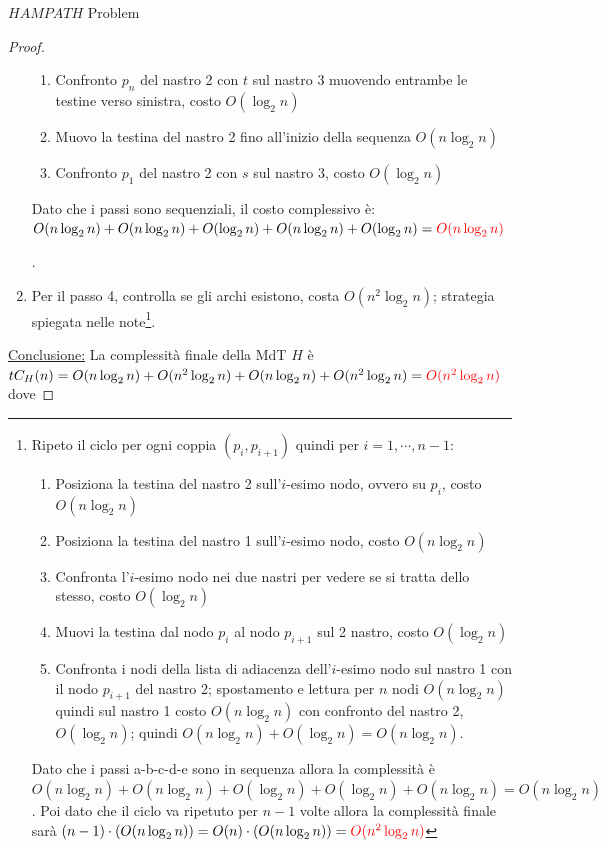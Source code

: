 \documentclass{article}  %
\theoremstyle{definition}
\begin{document}
\begin{theorem}{$HAMPATH$ Problem}
\begin{proof}
\begin{enumerate}
{\begin{enumerate}
					      \item Confronto $p_n$ del nastro 2 con $t$ sul nastro 3 muovendo entrambe le testine verso sinistra, costo $O(\log_2n)$
					      \item Muovo la testina del nastro 2 fino all'inizio della sequenza $O(n\log_2n)$
					      \item Confronto $p_1$ del nastro 2 con $s$ sul nastro 3, costo $O(\log_2n)$
				      \end{enumerate}
				      Dato che i passi sono sequenziali, il costo complessivo è: $O(n\log_2n)+O(n\log_2n)+O(\log_2n)+O(n\log_2n)+O(\log_2n)=\textcolor{red}{O(n\log_2n)}$\\
			      }.
			\item Per il passo 4, controlla se gli archi esistono, costa $O(n^2\log_2n)$; strategia spiegata nelle note\footnote{
				      Ripeto il ciclo per ogni coppia $(p_i, p_{i+1})$ quindi per $i=1, \cdots, n-1$:
				      \begin{enumerate}
					      \item Posiziona la testina del nastro 2 sull'$i$-esimo nodo, ovvero su $p_i$, costo $O(n\log_2n)$
					      \item Posiziona la testina del nastro 1 sull'$i$-esimo nodo, costo $O(n\log_2n)$
					      \item Confronta l'$i$-esimo nodo nei due nastri per vedere se si tratta dello stesso, costo $O(\log_2n)$
					      \item Muovi la testina dal nodo $p_i$ al nodo $p_{i+1}$ sul 2 nastro, costo $O(\log_2n)$
					      \item Confronta i nodi della lista di adiacenza dell'$i$-esimo nodo sul nastro 1 con il nodo $p_{i+1}$ del nastro 2; spostamento
					            e lettura per $n$ nodi $O(n\log_2n)$ quindi sul nastro 1 costo $O(n\log_2n)$ con confronto del nastro 2, $O(\log_2n)$; quindi
					            $O(n\log_2n)+O(\log_2n)=O(n\log_2n)$.
				      \end{enumerate}
				      Dato che i passi a-b-c-d-e sono in sequenza allora la complessità è $O(n\log_2n)+O(n\log_2n)+O(\log_2n)+O(\log_2n)+O(n\log_2n)=O(n\log_2n)$. Poi
				      dato che il ciclo va ripetuto per $n-1$ volte allora la complessità finale sarà $(n-1)\cdot(O(n\log_2n))=O(n)\cdot(O(n\log_2n))
					      =\textcolor{red}{O(n^2\log_2n)}$
			      }.
		\end{enumerate}
		\underline{Conclusione:} La complessità finale della MdT $H$ è $tC_H(n)=O(n\log_2n)+O(n^2\log_2n)+O(n\log_2n)+O(n^2\log_2n)=\textcolor{red}{O(n^2\log_2n)}$ dove

\end{proof}
\end{theorem}
\end{document}
